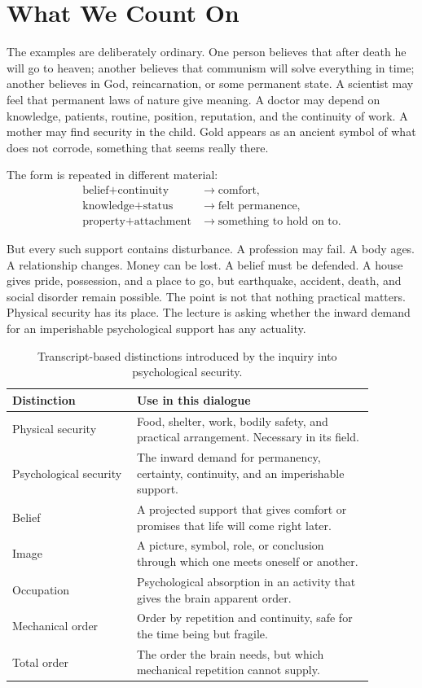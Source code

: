 \documentclass[11pt,oneside]{book}
\begin{document}
\section{What We Count On}

The examples are deliberately ordinary. One person believes that after death he will go to heaven; another believes that communism will solve everything in time; another believes in God, reincarnation, or some permanent state. A scientist may feel that permanent laws of nature give meaning. A doctor may depend on knowledge, patients, routine, position, reputation, and the continuity of work. A mother may find security in the child. Gold appears as an ancient symbol of what does not corrode, something that seems really there.

The form is repeated in different material:
\begin{align}
\text{belief}+\text{continuity}
&\longrightarrow
\text{comfort},\\
\text{knowledge}+\text{status}
&\longrightarrow
\text{felt permanence},\\
\text{property}+\text{attachment}
&\longrightarrow
\text{something to hold on to}.
\end{align}

But every such support contains disturbance. A profession may fail. A body ages. A relationship changes. Money can be lost. A belief must be defended. A house gives pride, possession, and a place to go, but earthquake, accident, death, and social disorder remain possible. The point is not that nothing practical matters. Physical security has its place. The lecture is asking whether the inward demand for an imperishable psychological support has any actuality.

\begin{table}
\centering
\begin{tabular}{|p{0.30\linewidth}|p{0.58\linewidth}|}
\hline
\textbf{Distinction} & \textbf{Use in this dialogue} \\
\hline
Physical security & Food, shelter, work, bodily safety, and practical arrangement. Necessary in its field. \\
\hline
Psychological security & The inward demand for permanency, certainty, continuity, and an imperishable support. \\
\hline
Belief & A projected support that gives comfort or promises that life will come right later. \\
\hline
Image & A picture, symbol, role, or conclusion through which one meets oneself or another. \\
\hline
Occupation & Psychological absorption in an activity that gives the brain apparent order. \\
\hline
Mechanical order & Order by repetition and continuity, safe for the time being but fragile. \\
\hline
Total order & The order the brain needs, but which mechanical repetition cannot supply. \\
\hline
\end{tabular}
\caption{Transcript-based distinctions introduced by the inquiry into psychological security.}
\end{table}
\end{document}
